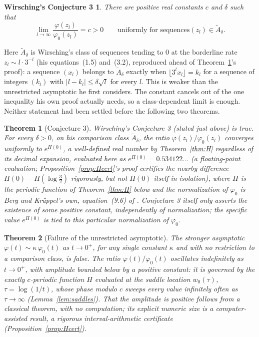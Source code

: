 \documentclass[11pt]{amsart}
\theoremstyle{plain}
\newtheorem{theorem}{Theorem}
\newtheorem*{conjecture}{Wirsching's Conjecture 3}
\theoremstyle{definition}
\theoremstyle{remark}
\begin{document}
\begin{conjecture}
There are positive real constants $c$ and $\delta$ such that
\[
\lim_{l\to\infty} \frac{\varphi(z_l)}{\varphi_0(z_l)} = c > 0 \qquad \text{uniformly for sequences
} (z_l) \in \widetilde A_\delta.
\]
\end{conjecture}

Here $\widetilde A_\delta$ is Wirsching's class of sequences tending to $0$ at the borderline rate
$z_l \sim l\cdot 3^{-l}$ (his equations~(1.5) and~(3.2), reproduced ahead of Theorem~\ref{thm:conj3}'s
proof): a sequence $(x_l)$ belongs to $\widetilde A_\delta$ exactly when $\lfloor 3^lx_l\rfloor =
k_l$ for a sequence of integers $(k_l)$ with $|l-k_l|\le\delta\sqrt l$ for every $l$. This is weaker
than the unrestricted asymptotic he first considers. The constant cancels out of the one inequality
his own proof actually needs, so a class-dependent limit is enough. Neither statement had been
settled before the following two theorems.

\begin{theorem}[Conjecture 3]
\label{thm:conj3}
Wirsching's Conjecture 3 (stated just above) is true. For every $\delta>0$, on his comparison
class $\widetilde{A}_\delta$, the ratio
$\varphi(z_l)/\varphi_0(z_l)$ converges uniformly to $e^{H(0)}$, a well-defined real number by
Theorem~\ref{thm:H} regardless of its decimal expansion, evaluated here as $e^{H(0)} =
0.534122\ldots$ (a floating-point evaluation; Proposition~\ref{prop:Hcert}'s proof certifies the
nearby difference $H(0)-H(\log\tfrac32)$ rigorously, but not $H(0)$ itself in isolation), where $H$
is the
periodic function of Theorem~\ref{thm:H} below and the normalization of $\varphi_0$ is Berg and
Kr\"uppel's own, equation~(9.6) of \cite{bergkruppel1998}. Conjecture 3 itself only asserts the
existence of some positive constant, independently of normalization; the specific value
$e^{H(0)}$ is tied to this particular normalization of $\varphi_0$.
\end{theorem}

\begin{theorem}[Failure of the unrestricted asymptotic]
\label{thm:unrestricted}
The stronger asymptotic $\varphi(t) \sim \kappa\,\varphi_0(t)$ as $t \to 0^+$, for any single
constant $\kappa$ and with no restriction to a comparison class, is false. The ratio
$\varphi(t)/\varphi_0(t)$ oscillates indefinitely as $t \to 0^+$, with amplitude bounded below by a
positive constant: it is governed by the exactly $c$-periodic function $H$ evaluated at
the saddle location $w_0(\tau)$, $\tau=\log(1/t)$, whose phase modulo $c$ sweeps every value
infinitely often as $\tau\to\infty$ (Lemma~\ref{lem:saddles}). That the amplitude is positive
follows from a classical theorem, with no computation; its explicit numeric size is a
computer-assisted result, a rigorous interval-arithmetic certificate
(Proposition~\ref{prop:Hcert}).
\end{theorem}
\end{document}
